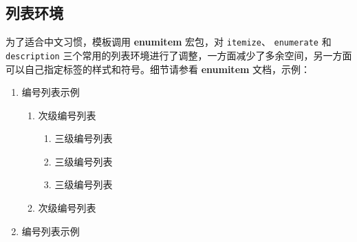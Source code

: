 \subsection*{列表环境}

为了适合中文习惯，模板调用 \textbf{enumitem} 宏包，对 \texttt{itemize}、 \texttt{enumerate} 和 \texttt{description} 三个常用的列表环境进行了调整，一方面减少了多余空间，另一方面可以自己指定标签的样式和符号。细节请参看 \textbf{enumitem} 文档，示例：
\begin{enumerate}
\item 编号列表示例
  \begin{enumerate}
    \item 次级编号列表
      \begin{enumerate}
        \item 三级编号列表
        \item 三级编号列表
        \item 三级编号列表
      \end{enumerate}
    \item 次级编号列表
  \end{enumerate}
\item 编号列表示例
\end{enumerate}